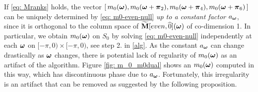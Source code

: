 If \eqref{eq: Mranks} holds, the vector $[\, m_0(\boldsymbol{\omega}),m_0(\boldsymbol{\omega}+\boldsymbol{\pi}_2), m_0(\boldsymbol{\omega} +\boldsymbol{\pi}_4), m_0(\boldsymbol{\omega}+\boldsymbol{\pi}_6) \,]$ can be uniquely determined by \eqref{eq: m0-even-null} {\it up to a constant factor $a_{\boldsymbol{\omega}} $}, since it is orthogonal to the column space of $\widetilde{\mathbf{M}}[even,\widehat{0}](\boldsymbol{\omega})$ of co-dimension 1. In particular, we obtain $m_0(\boldsymbol{\omega})$ on $S_0$ by solving \eqref{eq: m0-even-null} independently at each $\boldsymbol{\omega}$ on $[-\pi,0)\times[-\pi,0)$, see step 2. in \ref{alg}. As the constant $a_{\boldsymbol{\omega}}$ can change drastically as $\boldsymbol{\omega}$ changes, there is potential lack of regularity of $m_0(\boldsymbol{\omega})$ as an artifact of the algorithm. Figure \ref{fig: m_0_m0dual} shows an $m_0(\boldsymbol{\omega})$ computed in this way, which has discontinuous phase due to $a_{\boldsymbol{\omega}}$. Fortunately, this irregularity is an artifact that can be removed as suggested by the following proposition.

